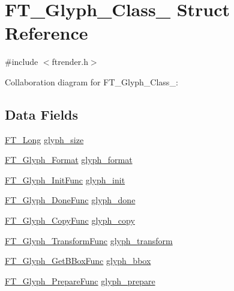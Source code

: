 \hypertarget{struct_f_t___glyph___class__}{}\section{F\+T\+\_\+\+Glyph\+\_\+\+Class\+\_\+ Struct Reference}
\label{struct_f_t___glyph___class__}


{\ttfamily \#include $<$ftrender.\+h$>$}



Collaboration diagram for F\+T\+\_\+\+Glyph\+\_\+\+Class\+\_\+\+:
\subsection*{Data Fields}
\begin{DoxyCompactItemize}
\item 
\hyperlink{fttypes_8h_a7fa72a1f0e79fb1860c5965789024d6f}{F\+T\+\_\+\+Long} \hyperlink{struct_f_t___glyph___class___a1a76c68b9fb0e93947e888c0fe77cbf8}{glyph\+\_\+size}
\item 
\hyperlink{ftimage_8h_aeca0d10a27aedecbf96515e0628aff1f}{F\+T\+\_\+\+Glyph\+\_\+\+Format} \hyperlink{struct_f_t___glyph___class___a26738bd14d5845e18d09ccaa3a709d23}{glyph\+\_\+format}
\item 
\hyperlink{ftrender_8h_a55b3628735bbb8ac0d485aec0f6ff737}{F\+T\+\_\+\+Glyph\+\_\+\+Init\+Func} \hyperlink{struct_f_t___glyph___class___a657200ad15ff061b38fb25b168737f95}{glyph\+\_\+init}
\item 
\hyperlink{ftrender_8h_a1e2936ce7a25061111dc3bfbeef20026}{F\+T\+\_\+\+Glyph\+\_\+\+Done\+Func} \hyperlink{struct_f_t___glyph___class___aabf05a4368dccacf45e1a54e542e5d63}{glyph\+\_\+done}
\item 
\hyperlink{ftrender_8h_a6d431bb14581040ff97ab1f695ac5f6b}{F\+T\+\_\+\+Glyph\+\_\+\+Copy\+Func} \hyperlink{struct_f_t___glyph___class___afc78dcdc4802760ebcaccf3a7b6cd088}{glyph\+\_\+copy}
\item 
\hyperlink{ftrender_8h_a6e39ad832662366565c93c53cf56fd0d}{F\+T\+\_\+\+Glyph\+\_\+\+Transform\+Func} \hyperlink{struct_f_t___glyph___class___a5f72ac1d0d92eb31fa3e2bb721a97ef2}{glyph\+\_\+transform}
\item 
\hyperlink{ftrender_8h_aba35e5441765cabf71e6ccdc248dac5c}{F\+T\+\_\+\+Glyph\+\_\+\+Get\+B\+Box\+Func} \hyperlink{struct_f_t___glyph___class___a06bfad431865c6731305cb781f78b317}{glyph\+\_\+bbox}
\item 
\hyperlink{ftrender_8h_ad8be01ff60862457d78927ebf1b90199}{F\+T\+\_\+\+Glyph\+\_\+\+Prepare\+Func} \hyperlink{struct_f_t___glyph___class___af7f406e5ea20a6614c946746938830c9}{glyph\+\_\+prepare}
\end{DoxyCompactItemize}


